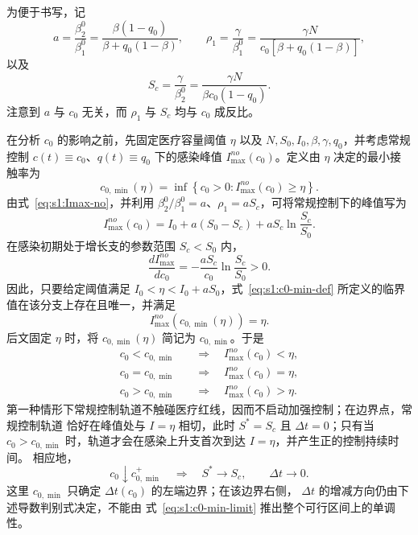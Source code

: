 \documentclass[lang=cn,a4paper,newtx]{elegantpaper}
\numberwithin{equation}{section}
\theoremstyle{plain}
\begin{document}
为便于书写，记
\begin{equation}
a=\frac{\beta_2^0}{\beta_1^0}
=
\frac{\beta(1-q_0)}{\beta+q_0(1-\beta)},
\qquad
\rho_1=\frac{\gamma}{\beta_1^0}
=
\frac{\gamma N}{c_0[\beta+q_0(1-\beta)]},
\end{equation}
以及
\begin{equation}
S_c=\frac{\gamma}{\beta_2^0}
=
\frac{\gamma N}{\beta c_0(1-q_0)}.
\end{equation}
注意到 $a$ 与 $c_0$ 无关，而 $\rho_1$ 与 $S_c$ 均与 $c_0$ 成反比。

在分析 $c_0$ 的影响之前，先固定医疗容量阈值 $\eta$ 以及
$N,S_0,I_0,\beta,\gamma,q_0$，并考虑常规控制
$c(t)\equiv c_0$、$q(t)\equiv q_0$ 下的感染峰值
$I_{\max}^{no}(c_0)$。定义由 $\eta$ 决定的最小接触率为
\begin{equation}
c_{0,\min}(\eta)
=
\inf\left\{
c_0>0:
I_{\max}^{no}(c_0)\geq \eta
\right\}.
\label{eq:s1:c0-min-def}
\end{equation}
由式~\eqref{eq:s1:Imax-no}，并利用
$\beta_2^0/\beta_1^0=a$、$\rho_1=aS_c$，可将常规控制下的峰值写为
\begin{equation}
I_{\max}^{no}(c_0)
=
I_0+a(S_0-S_c)+aS_c\ln\frac{S_c}{S_0}.
\label{eq:s1:Imax-no-c0}
\end{equation}
在感染初期处于增长支的参数范围 $S_c<S_0$ 内，
\begin{equation}
\frac{d I_{\max}^{no}}{dc_0}
=
-\frac{aS_c}{c_0}\ln\frac{S_c}{S_0}>0.
\label{eq:s1:Imax-no-c0-derivative}
\end{equation}
因此，只要给定阈值满足
$I_0<\eta<I_0+aS_0$，式~\eqref{eq:s1:c0-min-def} 所定义的临界值在该分支上存在且唯一，并满足
\begin{equation}
I_{\max}^{no}\!\left(c_{0,\min}(\eta)\right)=\eta.
\label{eq:s1:c0-min-equality}
\end{equation}
后文固定 $\eta$ 时，将 $c_{0,\min}(\eta)$ 简记为 $c_{0,\min}$。于是
\begin{equation}
\begin{aligned}
c_0<c_{0,\min}
&\quad\Longrightarrow\quad I_{\max}^{no}(c_0)<\eta,\\
c_0=c_{0,\min}
&\quad\Longrightarrow\quad I_{\max}^{no}(c_0)=\eta,\\
c_0>c_{0,\min}
&\quad\Longrightarrow\quad I_{\max}^{no}(c_0)>\eta.
\end{aligned}
\label{eq:s1:c0-min-regimes}
\end{equation}
第一种情形下常规控制轨道不触碰医疗红线，因而不启动加强控制；在边界点，常规控制轨道
恰好在峰值处与 $I=\eta$ 相切，此时 $S^*=S_c$ 且 $\Delta t=0$；只有当
$c_0>c_{0,\min}$ 时，轨道才会在感染上升支首次到达 $I=\eta$，并产生正的控制持续时间。
相应地，
\begin{equation}
c_0\downarrow c_{0,\min}^{+}
\quad\Longrightarrow\quad
S^*\to S_c,
\qquad
\Delta t\to0.
\label{eq:s1:c0-min-limit}
\end{equation}
这里 $c_{0,\min}$ 只确定 $\Delta t(c_0)$ 的左端边界；在该边界右侧，
$\Delta t$ 的增减方向仍由下述导数判别式决定，不能由
式~\eqref{eq:s1:c0-min-limit} 推出整个可行区间上的单调性。
\end{document}
